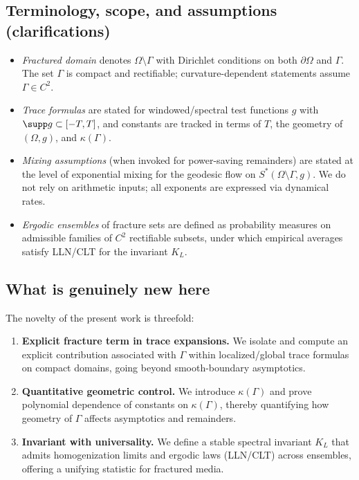\subsection*{Terminology, scope, and assumptions (clarifications)}
\begin{itemize}
  \item \emph{Fractured domain} denotes $\Omega\setminus\Gamma$ with Dirichlet conditions
  on both $\partial\Omega$ and $\Gamma$. The set $\Gamma$ is compact and rectifiable;
  curvature-dependent statements assume $\Gamma\in C^2$.
  \item \emph{Trace formulas} are stated for windowed/spectral test functions $g$
  with $\supp g\subset[-T,T]$, and constants are tracked in terms of $T$, the geometry
  of $(\Omega,g)$, and $\kappa(\Gamma)$.
  \item \emph{Mixing assumptions} (when invoked for power-saving remainders) are
  stated at the level of exponential mixing for the geodesic flow on $S^*(\Omega\setminus\Gamma,g)$.
  We do not rely on arithmetic inputs; all exponents are expressed via dynamical rates.
  \item \emph{Ergodic ensembles} of fracture sets are defined as probability measures
  on admissible families of $C^2$ rectifiable subsets, under which empirical averages
  satisfy LLN/CLT for the invariant $K_L$.
\end{itemize}

\subsection*{What is genuinely new here}
The novelty of the present work is threefold:
\begin{enumerate}[label=(N\arabic*)]
  \item \textbf{Explicit fracture term in trace expansions.} We isolate and compute an
  explicit contribution associated with $\Gamma$ within localized/global trace formulas
  on compact domains, going beyond smooth-boundary asymptotics.
  \item \textbf{Quantitative geometric control.} We introduce $\kappa(\Gamma)$ and
  prove polynomial dependence of constants on $\kappa(\Gamma)$, thereby quantifying
  how geometry of $\Gamma$ affects asymptotics and remainders.
  \item \textbf{Invariant with universality.} We define a stable spectral invariant $K_L$
  that admits homogenization limits and ergodic laws (LLN/CLT) across ensembles,
  offering a unifying statistic for fractured media.
\end{enumerate}

